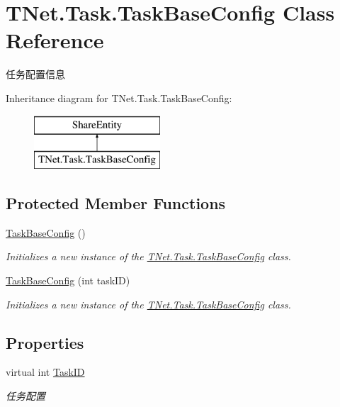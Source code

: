 \hypertarget{class_t_net_1_1_task_1_1_task_base_config}{}\section{T\+Net.\+Task.\+Task\+Base\+Config Class Reference}
\label{class_t_net_1_1_task_1_1_task_base_config}


任务配置信息  


Inheritance diagram for T\+Net.\+Task.\+Task\+Base\+Config\+:\begin{figure}[H]
\begin{center}
\leavevmode
\includegraphics[height=2.000000cm]{class_t_net_1_1_task_1_1_task_base_config}
\end{center}
\end{figure}
\subsection*{Protected Member Functions}
\begin{DoxyCompactItemize}
\item 
\mbox{\hyperlink{class_t_net_1_1_task_1_1_task_base_config_af18759b3e8261c50b3d2b3961ae9a170}{Task\+Base\+Config}} ()
\begin{DoxyCompactList}\small\item\em Initializes a new instance of the \mbox{\hyperlink{class_t_net_1_1_task_1_1_task_base_config}{T\+Net.\+Task.\+Task\+Base\+Config}} class. \end{DoxyCompactList}\item 
\mbox{\hyperlink{class_t_net_1_1_task_1_1_task_base_config_aa5180d2533ae22b6a44e16e6adcf2957}{Task\+Base\+Config}} (int task\+ID)
\begin{DoxyCompactList}\small\item\em Initializes a new instance of the \mbox{\hyperlink{class_t_net_1_1_task_1_1_task_base_config}{T\+Net.\+Task.\+Task\+Base\+Config}} class. \end{DoxyCompactList}\end{DoxyCompactItemize}
\subsection*{Properties}
\begin{DoxyCompactItemize}
\item 
virtual int \mbox{\hyperlink{class_t_net_1_1_task_1_1_task_base_config_ab77a73119b7ae0af25fa336038dd4e72}{Task\+ID}}
\begin{DoxyCompactList}\small\item\em 任务配置 \end{DoxyCompactList}\end{DoxyCompactItemize}



